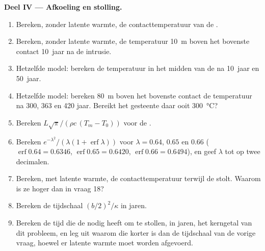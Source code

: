 \begin{problem}
\noindent\textbf{Deel IV --- Afkoeling en stolling.}
\begin{enumerate}[resume]
\item Bereken, zonder latente warmte, de contacttemperatuur van de .
\item Bereken, zonder latente warmte, de temperatuur \qty{10}{m} boven het bovenste
contact \num{10}~jaar na de intrusie.
\item Hetzelfde model: bereken de temperatuur in het midden van de  na
\num{10}~jaar en \num{50}~jaar.
\item Hetzelfde model: bereken \qty{80}{m} boven het bovenste contact de temperatuur na
\num{300}, \num{363} en \num{420} jaar. Bereikt het gesteente daar ooit
\qty{300}{\celsius}?
\item Bereken $L\sqrt\pi/(\rho c\,(T_m - T_0))$ voor de .
\item Bereken $e^{-\lambda^2}/(\lambda(1 + \operatorname{erf}\lambda))$ voor $\lambda = 0.64$,
$0.65$ en $0.66$ ($\operatorname{erf}0.64 = 0.6346$, $\operatorname{erf}0.65 = 0.6420$,
$\operatorname{erf}0.66 = 0.6494$), en geef $\lambda$ tot op twee decimalen.
\item Bereken, met latente warmte, de contacttemperatuur terwijl de 
stolt. Waarom is ze hoger dan in vraag 18?
\item Bereken de tijdschaal $(b/2)^2/\kappa$ in jaren.
\item Bereken de tijd die de  nodig heeft om te stollen, in jaren, het kerngetal van
dit probleem, en leg uit waarom die korter is dan de tijdschaal van de vorige
vraag, hoewel er latente warmte moet worden afgevoerd.
\end{enumerate}
\end{problem}
